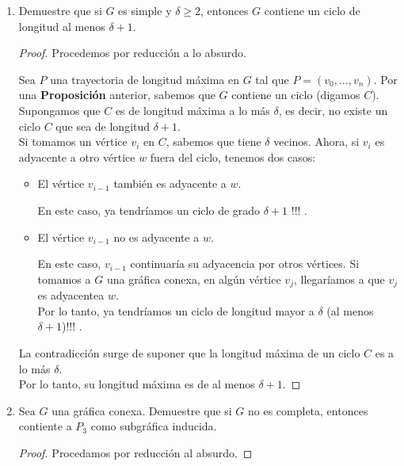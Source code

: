 \documentclass{article}
\begin{document}
\begin{enumerate}
    \item Demuestre que si $G$ es simple y $\delta \ge 2$, entonces $G$ contiene
    un ciclo de longitud al menos $\delta + 1$.

      \begin{proof}
        Procedemos por reducción a lo absurdo.

        Sea $P$ una trayectoria de longitud máxima en $G$ tal que $P = (v_{0}, \dots, v_{n})$.
        Por una \textbf{Proposición} anterior, sabemos que $G$ contiene un ciclo (digamos $C$). \\
        Supongamos que $C$ es de longitud máxima a lo más $\delta$, es decir, no existe un ciclo $C$
        que sea de longitud $\delta + 1$. \\
        Si tomamos un vértice $v_{i}$ en $C$, sabemos que tiene $\delta$ vecinos. Ahora, si $v_{i}$ es
        adyacente a otro vértice $w$ fuera del ciclo, tenemos dos casos:
        \begin{itemize}
          \item El vértice $v_{i-1}$ también es adyacente a $w$.

            En este caso, ya tendríamos un ciclo de grado $\delta + 1$ !!! .

          \item El vértice $v_{i-1}$ no es adyacente a $w$.

            En este caso, $v_{i-1}$ continuaría su adyacencia por otros vértices. Si tomamos a $G$
            una gráfica conexa, en algún vértice $v_{j}$, llegaríamos a que $v_{j}$ es adyacentea $w$. \\
            Por lo tanto, ya tendríamos un ciclo de longitud mayor a $\delta$ (al menos $\delta + 1$)!!! .
        \end{itemize}

        La contradicción surge de suponer que la longitud máxima de un ciclo $C$ es a lo más $\delta$. \\
        Por lo tanto, su longitud máxima es de al menos $\delta + 1$.
      \end{proof}

    \item Sea $G$ una gr\'afica conexa.   Demuestre que si $G$ no es completa,
      entonces contiente a $P_3$ como subgr\'afica inducida.
      \renewcommand\qedsymbol{QED}
      \begin{proof}
        Procedamos por reducción al absurdo.


\end{proof}
\end{enumerate}
\end{document}

